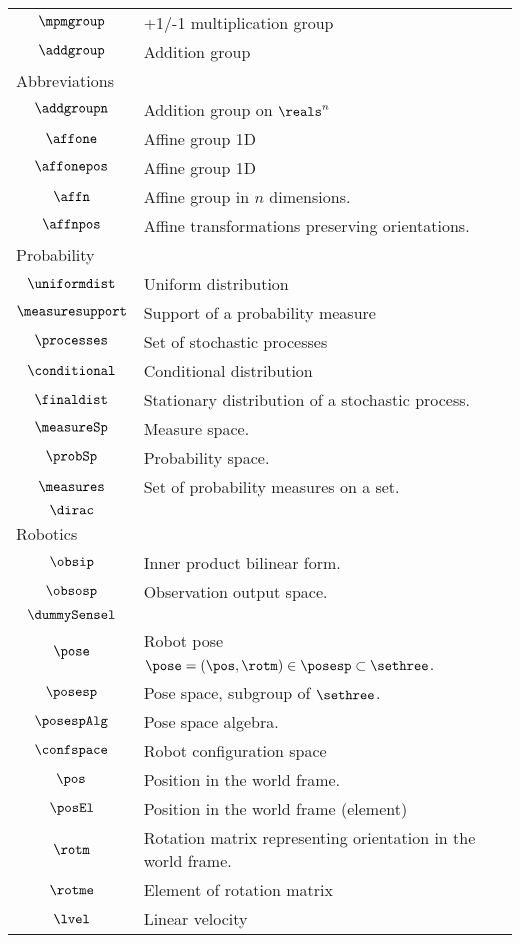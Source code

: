 \begin{longtable}{cl}
 $\mpmgroup$ &  +1/-1 multiplication group\\ 
 $\addgroup$ &  Addition group\\ 
 \multicolumn{2}{l}{Abbreviations}\\ 
 \hline
$\addgroupn$ &  Addition group on $\reals^n$\\ 
 $\affone$ &  Affine group 1D\\ 
 $\affonepos$ &  Affine group 1D\\ 
 $\affn$ &  Affine group in $n$ dimensions.\\ 
 $\affnpos$ &  Affine transformations preserving orientations.\\ 
 \multicolumn{2}{l}{Probability}\\ 
 \hline
$\uniformdist$ &  Uniform distribution\\ 
 $\measuresupport$ &  Support of a probability measure\\ 
 $\processes$ &  Set of stochastic processes\\ 
 $\conditional$ &  Conditional distribution\\ 
 $\finaldist$ &  Stationary distribution of a stochastic process.\\ 
 $\measureSp$ &  Measure space.\\ 
 $\probSp$ &  Probability space.\\ 
 $\measures$ &  Set of probability measures on a set.\\ 
 $\dirac$ & \\ 
 \multicolumn{2}{l}{Robotics}\\ 
 \hline
$\obsip$ &  Inner product bilinear form.\\ 
 $\obsosp$ &  Observation output space.\\ 
 $\dummySensel$ & \\ 
 $\pose$ &  Robot pose $\pose = (\pos, \rotm) \in \posesp \subset \sethree$.\\ 
 $\posesp$ &  Pose space, subgroup of $\sethree$.\\ 
 $\posespAlg$ &  Pose space algebra.\\ 
 $\confspace$ &  Robot configuration space\\ 
 $\pos$ &  Position in the world frame.\\ 
 $\posEl$ &  Position in the world frame (element)\\ 
 $\rotm$ &  Rotation matrix representing orientation in the world frame.\\ 
 $\rotme$ &  Element of rotation matrix\\ 
 $\lvel$ &  Linear velocity\\ 

\end{longtable}
